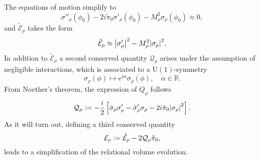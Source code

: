 \documentclass[11pt,a4paper]{article}
\newcommand{\R}{\mathbb R}
\newcommand{\e}{\textrm{e}}
\newcommand{\defeq}{\vcentcolon=}
\begin{document}
The equations of motion simplify to 
%
\begin{equation}\label{eq:approximate eom}
\sigma''_{\rho}(\phi_0) -2i\tilde{\pi}_0\sigma'_{\rho}(\phi_0)-M_{\rho}^2\sigma_{\rho}(\phi_0) \approx 0,
\end{equation}
%
and $\tilde{\mathcal{E}}_{\rho}$ takes the form
%
\begin{equation}\label{eq:approximate energy}
\tilde{\mathcal{E}}_{\rho} 
\approx
\abs{\sigma'_{\rho}}^2-M_{\rho}^2\abs{\sigma_{\rho}}^2.
\end{equation}
%
In addition to $\tilde{\mathcal{E}}_{\rho}$ a second conserved quantity $\mathcal{Q}_{\rho}$ arises under the assumption of negligible interactions, which is associated to a $\text{U}(1)$-symmetry
%
\begin{equation}
\sigma_{\rho}(\phi)\longmapsto \e^{i\alpha}\sigma_{\rho}(\phi),\quad\alpha\in\R.
\end{equation}
%
From Noether's theorem, the expression of $Q_{\rho}$ follows
%
\begin{equation}\label{eq:definition of Q}
\mathcal{Q}_{\rho}
\defeq
-\frac{i}{2}
\left[\bar{\sigma}_{\rho}\sigma'_{\rho} - \bar{\sigma}'_{\rho}\sigma_{\rho}-2i\tilde{\pi}_0\abs{\sigma_{\rho}}^2\right].
\end{equation}
%
As it will turn out, defining a third conserved quantity
%
\begin{equation}\label{eq:definition of E}
\mathcal{E}_{\rho}
\defeq
\tilde{\mathcal{E}}_{\rho} - 2\mathcal{Q}_{\rho}\tilde{\pi}_0,
\end{equation}
%
leads to a simplification of the relational volume evolution.
\end{document}
